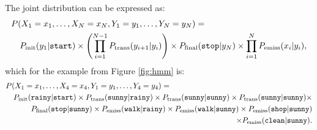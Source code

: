 The joint distribution can be expressed as:
\begin{eqnarray}\label{eqn:hmm}
\lefteqn{P(X_1=x_1,\ldots,X_N=x_N,Y_1=y_1,\ldots,Y_N=y_N)=}\nonumber\\
&&
P_{\mathrm{init}}(y_1|\text{\tt start}) 
\times
\left(
\prod_{i=1}^{N-1} P_{\mathrm{trans}}(y_{i+1}|y_i)
\right)
\times
P_{\mathrm{final}}(\text{\tt stop}|y_N)
\times 
\prod_{i=1}^{N} P_{\mathrm{emiss}}(x_i|y_i),
\end{eqnarray}
which for the example from Figure \ref{fig:hmm} is:
\begin{eqnarray}  \label{eqn:hmm_ex}
\lefteqn{P(X_1=x_1,\ldots,X_4=x_4,Y_1=y_1,\ldots,Y_4=y_4)=}\nonumber\\
&&
P_{\mathrm{init}}(\text{\tt rainy}|\text{\tt start}) 
\times
P_{\mathrm{trans}}(\text{\tt sunny}|\text{\tt rainy}) 
\times
P_{\mathrm{trans}}(\text{\tt sunny}|\text{\tt sunny}) 
\times
P_{\mathrm{trans}}(\text{\tt sunny}|\text{\tt sunny}) 
\times\nonumber\\&&
P_{\mathrm{final}}(\text{\tt stop}|\text{\tt sunny}) 
\times
P_{\mathrm{emiss}}(\text{\tt walk}|\text{\tt rainy}) 
\times
P_{\mathrm{emiss}}(\text{\tt walk}|\text{\tt sunny}) 
\times
P_{\mathrm{emiss}}(\text{\tt shop}|\text{\tt sunny}) \nonumber\\&&
\times
P_{\mathrm{emiss}}(\text{\tt clean}|\text{\tt sunny}).
\end{eqnarray}
%



